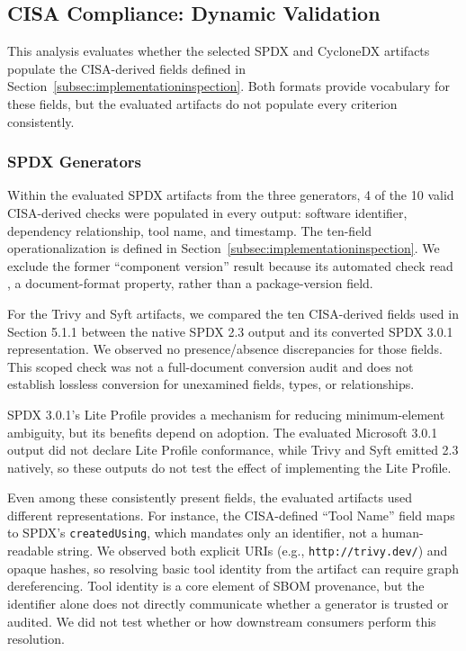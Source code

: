 \subsection{CISA Compliance: Dynamic Validation}
\label{subsec:cisa-compliance}
This analysis evaluates whether the selected SPDX and CycloneDX artifacts populate the CISA-derived fields defined in Section~\ref{subsec:implementationinspection}. Both formats provide vocabulary for these fields, but the evaluated artifacts do not populate every criterion consistently.

\subsubsection{SPDX Generators}
Within the evaluated SPDX artifacts from the three generators, 4 of the 10 valid CISA-derived checks were populated in every output: software identifier, dependency relationship, tool name, and timestamp. The ten-field operationalization is defined in Section~\ref{subsec:implementationinspection}. We exclude the former ``component version'' result because its automated check read , a document-format property, rather than a package-version field.

For the Trivy and Syft artifacts, we compared the ten CISA-derived fields used in Section 5.1.1 between the native SPDX 2.3 output and its converted SPDX 3.0.1 representation. We observed no presence/absence discrepancies for those fields. This scoped check was not a full-document conversion audit and does not establish lossless conversion for unexamined fields, types, or relationships.

SPDX 3.0.1's Lite Profile provides a mechanism for reducing minimum-element ambiguity, but its benefits depend on adoption. The evaluated Microsoft 3.0.1 output did not declare Lite Profile conformance, while Trivy and Syft emitted 2.3 natively, so these outputs do not test the effect of implementing the Lite Profile.

Even among these consistently present fields, the evaluated artifacts used different representations. For instance, the CISA-defined ``Tool Name'' field maps to SPDX's \texttt{createdUsing}, which mandates only an identifier, not a human-readable string. We observed both explicit URIs (e.g., \texttt{http://trivy.dev/}) and opaque hashes, so resolving basic tool identity from the artifact can require graph dereferencing. Tool identity is a core element of SBOM provenance, but the identifier alone does not directly communicate whether a generator is trusted or audited. We did not test whether or how downstream consumers perform this resolution.

